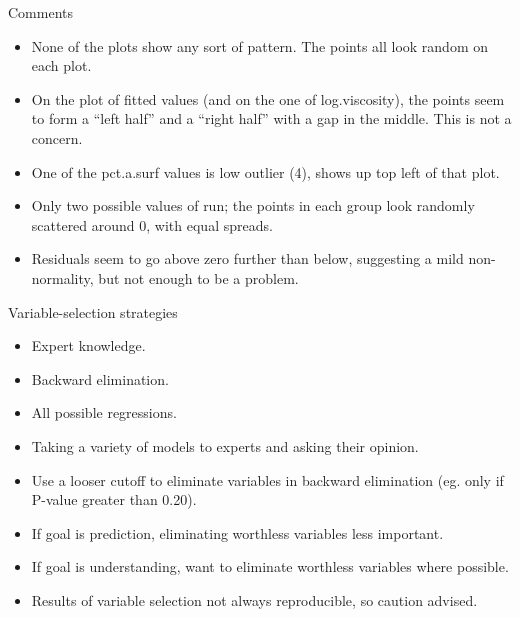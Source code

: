 \begin{frame}{Comments}
\protect\hypertarget{comments-4}{}
\begin{itemize}
\tightlist
\item
  None of the plots show any sort of pattern. The points all look random
  on each plot.
\item
  On the plot of fitted values (and on the one of log.viscosity), the
  points seem to form a ``left half'' and a ``right half'' with a gap in
  the middle. This is not a concern.
\item
  One of the pct.a.surf values is low outlier (4), shows up top left of
  that plot.
\item
  Only two possible values of run; the points in each group look
  randomly scattered around 0, with equal spreads.
\item
  Residuals seem to go above zero further than below, suggesting a mild
  non-normality, but not enough to be a problem.
\end{itemize}
\end{frame}

\begin{frame}{Variable-selection strategies}
\protect\hypertarget{variable-selection-strategies}{}
\begin{itemize}
\tightlist
\item
  Expert knowledge.
\item
  Backward elimination.
\item
  All possible regressions.
\item
  Taking a variety of models to experts and asking their opinion.
\item
  Use a looser cutoff to eliminate variables in backward elimination
  (eg. only if P-value greater than 0.20).
\item
  If goal is prediction, eliminating worthless variables less important.
\item
  If goal is understanding, want to eliminate worthless variables where
  possible.
\item
  Results of variable selection not always reproducible, so caution
  advised.
\end{itemize}
\end{frame}
